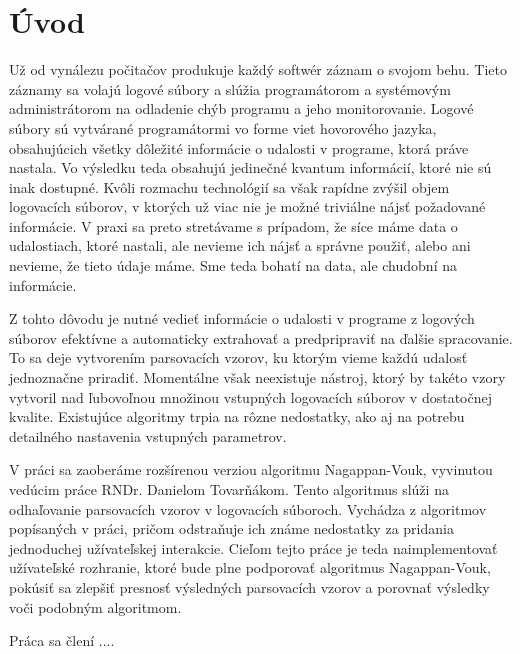 \chapter{Úvod}

Už od vynálezu počitačov produkuje každý softwér záznam o svojom behu. Tieto záznamy sa volajú logové súbory a slúžia programátorom a systémovým administrátorom na odladenie chýb programu a jeho monitorovanie. Logové súbory sú vytvárané programátormi vo forme viet hovorového jazyka, obsahujúcich všetky dôležité informácie o udalosti v programe, ktorá práve nastala. Vo výsledku teda obsahujú jedinečné kvantum informácií, ktoré nie sú inak dostupné. Kvôli rozmachu technológií sa však rapídne zvýšil objem logovacích súborov, v ktorých už viac nie je možné triviálne nájsť požadované informácie. V praxi sa preto stretávame s prípadom, že síce máme data o udalostiach, ktoré nastali, ale nevieme ich nájsť a správne použiť, alebo ani nevieme, že tieto údaje máme. Sme teda bohatí na data, ale chudobní na informácie.
\par Z tohto dôvodu je nutné vedieť informácie o udalosti v programe z logových súborov efektívne a automaticky extrahovať a predpripraviť na ďalšie spracovanie. To sa deje vytvorením parsovacích vzorov, ku ktorým vieme každú udalosť jednoznačne priradiť. Momentálne však neexistuje nástroj, ktorý by takéto vzory vytvoril nad ľubovoľnou množinou vstupných logovacích súborov v dostatočnej kvalite. Existujúce algoritmy trpia na rôzne nedostatky, ako aj na potrebu detailného nastavenia vstupných parametrov.
\par V práci sa zaoberáme rozšírenou verziou algoritmu Nagappan-Vouk, vyvinutou vedúcim práce RNDr. Danielom Tovarňákom. Tento algoritmus slúži na odhaľovanie parsovacích vzorov v logovacích súboroch. Vychádza z algoritmov popísaných v práci, pričom odstraňuje ich známe nedostatky za pridania jednoduchej užívateľskej interakcie. Cieľom tejto práce je teda naimplementovať užívateľské rozhranie, ktoré bude plne podporovať algoritmus Nagappan-Vouk, pokúsiť sa zlepšiť presnosť výsledných parsovacích vzorov a porovnať výsledky voči podobným algoritmom.
 \par Práca sa člení ....